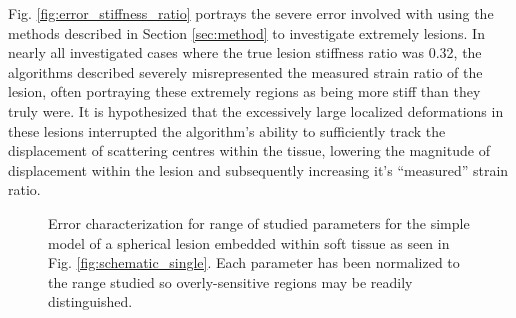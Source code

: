 			Fig. \ref{fig:error_stiffness_ratio} portrays the severe error involved with using the methods described in Section \ref{sec:method} to investigate extremely  lesions. In nearly all investigated cases where the true lesion stiffness ratio was 0.32, the algorithms described severely misrepresented the measured strain ratio of the lesion, often portraying these extremely  regions as being more stiff than they truly were. It is hypothesized that the excessively large localized deformations in these lesions interrupted the algorithm's ability to sufficiently track the displacement of scattering centres within the tissue, lowering the magnitude of displacement within the lesion and subsequently increasing it's ``measured'' strain ratio.

			\begin{figure}[!t]
				\centering
				\caption[Error characterization for spherical lesion models]{Error characterization for range of studied parameters for the simple model of a spherical lesion embedded within soft tissue as seen in Fig. \ref{fig:schematic_single}. Each parameter has been normalized to the range studied so overly-sensitive regions may be readily distinguished.}
				\label{fig:normalized_characterization}
			\end{figure}

